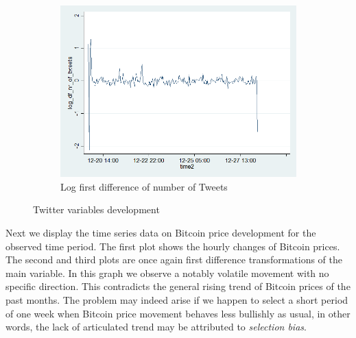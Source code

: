 \documentclass[a4paper,american,12pt]{article}
\begin{document}
\begin{spacing}{1.2}
\begin{figure}[H]
\begin{subfigure}{.3\textwidth}
	\includegraphics[width=1.12\textwidth]{stata_export_graphs/graph_plot_log_df_nr_tweets.png}
	\caption{Log first difference of number of Tweets}
	\end{subfigure}
\caption{Twitter variables development}
\end{figure}

Next we display the time series data on Bitcoin price development for the observed time period. The first plot shows the hourly changes of Bitcoin prices. The second and third plots are once again first difference transformations of the main variable. In this graph we observe a notably volatile movement with no specific direction. This contradicts the general rising trend of Bitcoin prices of the past months. The problem may indeed arise if we happen to select a short period of one week when Bitcoin price movement behaves less bullishly as usual, in other words, the lack of articulated trend may be attributed to \textit{selection bias}.\\


\end{spacing}
\end{document}
